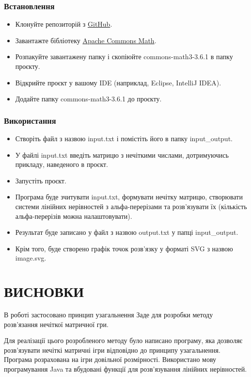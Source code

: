 \documentclass[14pt, a4paper, oneside]{extarticle}
\numberwithin{equation}{section}
\begin{document}
\subsubsection*{Встановлення}
\begin{itemize}
\item Клонуйте репозиторій з \href{https://github.com/PivDen2000/Fuzzy-games}{GitHub}.
\item Завантажте бібліотеку \href{https://commons.apache.org/proper/commons-math/download_math.cgi}{Apache Commons Math}.
\item Розпакуйте завантажену папку і скопіюйте commons-math3-3.6.1 в папку проєкту.
\item Відкрийте проєкт у вашому IDE (наприклад, Eclipse, IntelliJ IDEA).
\item Додайте папку commons-math3-3.6.1 до проєкту.
\end{itemize}

\subsubsection*{Використання}

\begin{itemize}
\item Створіть файл з назвою input.txt і помістіть його в папку input\_output.
\item У файлі input.txt введіть матрицю з нечіткими числами, дотримуючись прикладу, наведеного в проєкт.
\item Запустіть проєкт.
\item Програма буде зчитувати input.txt, формувати нечітку матрицю, створювати системи лінійних нерівностей з альфа-перерізами та розв'язувати їх (кількість альфа-перерізів можна налаштовувати).
\item Результат буде записано у файл з назвою output.txt у папці input\_output.
\item Крім того, буде створено графік точок розв'язку у форматі SVG з назвою image.svg.
\end{itemize}

\section*{ВИСНОВКИ}
В роботі застосовано принцип узагальнення Заде для розробки методу розв'язання нечіткої матричної гри. 

Для реалізації цього розробленого методу було написано програму, яка дозволяє розв'язувати нечіткі матричні ігри відповідно до принципу узагальнення. Програма розрахована на ігри довільної розмірності. Використано мову програмування Java та вбудовані функції для розв'язування лінійних нерівностей.
\end{document}

